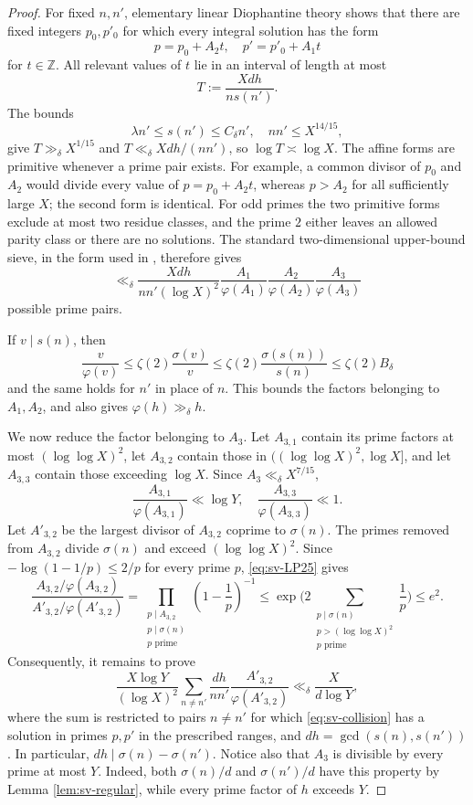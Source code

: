 \documentclass[11pt,letterpaper,reqno]{amsart}
\numberwithin{equation}{section}
\theoremstyle{remark}
\newcommand{\Z}{\mathbb{Z}}
\renewcommand{\leq}{\leqslant}
\begin{document}
\begin{proof}
For fixed $n,n'$, elementary linear Diophantine theory shows that there
are fixed integers $p_0,p'_0$ for which every integral solution has the form
\[
 p=p_0+A_2t,\quad p'=p'_0+A_1t
\]
for $t\in\Z$.
All relevant values of $t$ lie in an interval of length at most
\[
 T:=\frac{Xdh}{n s(n')}.
\]
The bounds
\[
 \lambda n'\leq s(n')\leq C_\delta n',
 \quad nn'\leq X^{14/15},
\]
give $T\gg_\delta X^{1/15}$ and
$T\ll_\delta Xdh/(nn')$, so $\log T\asymp\log X$. The affine forms are
primitive whenever a prime pair exists. For example, a common divisor of
$p_0$ and $A_2$ would divide every value of $p=p_0+A_2t$, whereas
$p>A_2$ for all sufficiently large $X$; the second form is identical.
For odd primes the two primitive forms exclude at most two residue classes,
and the prime $2$ either leaves an allowed parity class or there are no
solutions. The standard two-dimensional upper-bound sieve, in the form used in
\cite[(3.7)]{LucaPomerance}, therefore gives
\[
 \ll_\delta
 \frac{Xdh}{nn'(\log X)^2}
 \frac{A_1}{\varphi(A_1)}
 \frac{A_2}{\varphi(A_2)}
 \frac{A_3}{\varphi(A_3)}
\]
possible prime pairs.

If $v\mid s(n)$, then
\begin{equation}\label{eq:sv-totient}
 \frac v{\varphi(v)}
 \leq\zeta(2)\frac{\sigma(v)}v
 \leq\zeta(2)\frac{\sigma(s(n))}{s(n)}
 \leq\zeta(2)B_\delta
\end{equation}
and the same holds for $n'$ in place of $n$.
This bounds the factors belonging to $A_1,A_2$, and also gives
$\varphi(h)\gg_\delta h$.

We now reduce the factor belonging to $A_3$. Let $A_{3,1}$ contain its
prime factors at most $(\log\log X)^2$, let $A_{3,2}$ contain those in
$((\log\log X)^2,\log X]$, and let $A_{3,3}$ contain those exceeding
$\log X$. Since $A_3\ll_\delta X^{7/15}$,
\[
 \frac{A_{3,1}}{\varphi(A_{3,1})}\ll\log Y,
 \quad
 \frac{A_{3,3}}{\varphi(A_{3,3})}\ll1.
\]
Let $A'_{3,2}$ be the largest divisor of $A_{3,2}$ coprime to
$\sigma(n)$. The primes removed from $A_{3,2}$ divide $\sigma(n)$ and
exceed $(\log\log X)^2$. Since $-\log(1-1/p)\leq2/p$ for every prime $p$,
\eqref{eq:sv-LP25} gives
\[
 \frac{A_{3,2}/\varphi(A_{3,2})}{A'_{3,2}/\varphi(A'_{3,2})}
 =\prod_{\substack{p\mid A_{3,2}\\p\mid\sigma(n)\\p\text{ prime}}}
 \left(1-\frac1p\right)^{-1}
 \leq\exp\biggl(
 2\sum_{\substack{p\mid\sigma(n)\\p>(\log\log X)^2\\p\text{ prime}}}
 \frac1p\biggr)
 \leq e^2.
\]
Consequently, it remains to prove
\begin{equation}\label{eq:sv-reduced-collision-sum}
 \frac{X\log Y}{(\log X)^2}
 \sum_{n\ne n'}
 \frac{dh}{nn'}
 \frac{A'_{3,2}}{\varphi(A'_{3,2})}
 \ll_\delta\frac{X}{d\log Y},
\end{equation}
where the sum is restricted to pairs $n\ne n'$ for which
\eqref{eq:sv-collision} has a solution in primes $p,p'$ in the prescribed
ranges, and $dh=\gcd(s(n),s(n'))$.
In particular, $dh\mid\sigma(n)-\sigma(n')$.
Notice also that $A_3$ is divisible by every
prime at most $Y$. Indeed, both $\sigma(n)/d$ and $\sigma(n')/d$ have this
property by Lemma \ref{lem:sv-regular}, while every prime factor of $h$
exceeds $Y$.


\end{proof}
\end{document}
